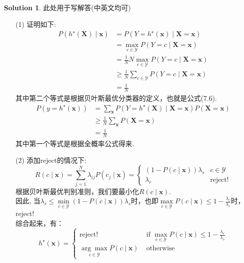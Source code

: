 \documentclass[a4paper,UTF8]{article}
\numberwithin{equation}{section}
\theoremstyle{definition}
\newtheorem*{solution}{Solution}
\begin{document}
\begin{solution}
此处用于写解答(中英文均可) \\
\begin{enumerate}
    \item [(1)]
    证明如下:
    \begin{align*} P\left(h^{\star}(\boldsymbol{X}) \mid \boldsymbol{x}\right) & =P\left(Y=h^{\star}(\boldsymbol{x}) \mid \boldsymbol{X}=\boldsymbol{x}\right) \\ & =\max _{c \in \mathcal{Y}} P(Y=c \mid \boldsymbol{X}=\boldsymbol{x}) \\ & =\frac{1}{N} N \max _{c \in \mathcal{Y}} P(Y=c \mid \boldsymbol{X}=\boldsymbol{x}) \\ & \geq \frac{1}{N} \sum_{c \in \mathcal{Y}} P(Y=c \mid \boldsymbol{X}=\boldsymbol{x}) \\ & =\frac{1}{N} \end{align*}
    其中第二个等式是根据贝叶斯最优分类器的定义，也就是公式(7.6). \\
    \begin{align*}
        P\left(y=h^{\star}(\boldsymbol{x})\right) & =\sum_{\boldsymbol{x}} P\left(Y=h^{\star}(\boldsymbol{X}) \mid \boldsymbol{X}=\boldsymbol{x}\right) P(\boldsymbol{X}=\boldsymbol{x}) \\ & \geq \frac{1}{N} \sum_{\boldsymbol{x}} P(\boldsymbol{X}=\boldsymbol{x}) \\ & =\frac{1}{N}
    \end{align*}
    其中第一个等式是根据全概率公式得来.
    \item [(2)]
    添加reject的情况下: 
    \begin{equation}
        R(c \mid \boldsymbol{x})=\sum_{j=1}^{N} \lambda_{i j} P\left(c_{j} \mid \boldsymbol{x}\right)=\left\{\begin{array}{ll}(1-P(c \mid \boldsymbol{x})) \lambda_{s} & c \in \mathcal{Y} \\ \lambda_{r} & \text{reject!}\end{array}\right. \nonumber
    \end{equation}
    根据贝叶斯最优判别准则，我们要最小化$R(c \mid \boldsymbol{x})$. \\
    因此, 当$\lambda_r \leqslant \min\limits_{c \in \mathcal{Y}}(1-P(c \mid \boldsymbol{x})) \lambda_{s}$时，也即$\max \limits_{c \in \mathcal{Y}} P(c \mid \boldsymbol{x}) \leq 1-\frac{\lambda_{r}}{\lambda_{s}}$时，reject! \\
    综合起来，有：
    \begin{equation}
        h^{\star}(\boldsymbol{x})=\left\{\begin{array}{ll}\text{reject! }&\text{ if } \max \limits_{c \in \mathcal{Y}} P(c \mid \boldsymbol{x}) \leq 1-\frac{\lambda_{r}}{\lambda_{s}}\\\underset{c \in \mathcal{Y}}{\arg \max } P(c \mid \boldsymbol{x}) & \text { otherwise }  \end{array}\right. \nonumber

\end{equation}
\end{enumerate}
\end{solution}
\end{document}
